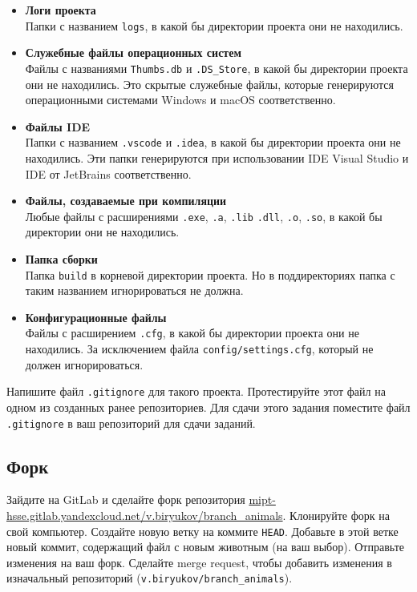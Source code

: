 \documentclass{article}
\begin{document}
\begin{itemize}
\item \textbf{Логи проекта}\\
Папки с названием \texttt{logs}, в какой бы директории проекта они не находились.

\item \textbf{Служебные файлы операционных систем}\\
Файлы с названиями \texttt{Thumbs.db} и \texttt{.DS\_Store}, в какой бы директории проекта они не находились. Это скрытые служебные файлы, которые генерируются операционными системами Windows и macOS соответственно.

\item \textbf{Файлы IDE}\\
Папки с названием \texttt{.vscode} и \texttt{.idea}, в какой бы директории проекта они не находились. Эти папки генерируются при использовании IDE Visual Studio и IDE от JetBrains соответственно.

\item \textbf{Файлы, создаваемые при компиляции}\\
Любые файлы с расширениями \texttt{.exe}, \texttt{.a}, \texttt{.lib} \texttt{.dll}, \texttt{.o}, \texttt{.so}, в какой бы директории они не находились.

\item \textbf{Папка сборки}\\
Папка \texttt{build} в корневой директории проекта. Но в поддиректориях папка с таким названием игнорироваться не должна.

\item \textbf{Конфигурационные файлы}\\
Файлы с расширением \texttt{.cfg}, в какой бы директории проекта они не находились. За исключением файла \texttt{config/settings.cfg}, который не должен игнорироваться.
\end{itemize}
Напишите файл \texttt{.gitignore} для такого проекта. Протестируйте этот файл на одном из созданных ранее репозиториев.
Для сдачи этого задания поместите файл \texttt{.gitignore} в ваш репозиторий для сдачи заданий.


\subsection{Форк}
Зайдите на GitLab и сделайте форк репозитория \href{https://mipt-hsse.gitlab.yandexcloud.net/v.biryukov/branch_animals}{mipt-hsse.gitlab.yandexcloud.net/v.biryukov/branch\_animals}. Клонируйте форк на свой компьютер. Создайте новую ветку на коммите \texttt{HEAD}. Добавьте в этой ветке новый коммит, содержащий файл с новым животным (на ваш выбор). Отправьте изменения на ваш форк. Сделайте merge request, чтобы добавить изменения в изначальный репозиторий (\texttt{v.biryukov/branch\_animals}).
\end{document}
